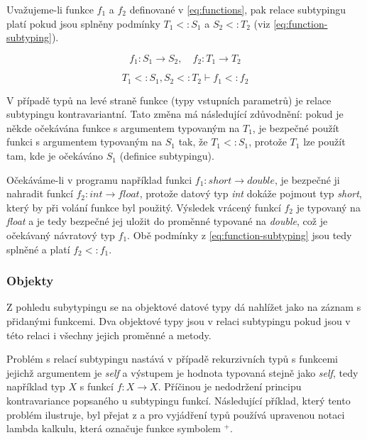\documentclass[czech,DP]{thesiskiv}
\begin{document}
Uvažujeme-li funkce $f_1$ a $f_2$ definované v \ref{eq:functions}, pak relace subtypingu platí pokud jsou splněny podmínky $T_1 <: S_1$ a $S_2 <: T_2$ (viz \ref{eq:function-subtyping}).

\begin{equation}
	f_1: S_1 \rightarrow S_2,\quad f_2: T_1 \rightarrow T_2
	\label{eq:functions}
\end{equation}

\begin{equation}
	T_1 <: S_1, S_2 <: T_2 \vdash f_1 <: f_2
	\label{eq:function-subtyping}
\end{equation}

V případě typů na levé straně funkce (typy vstupních parametrů) je relace subtypingu kontravariantní. Tato změna má následující zdůvodnění: pokud je někde očekávána funkce s argumentem typovaným na $T_1$, je bezpečné použít funkci s argumentem typovaným na $S_1$ tak, že $T_1 <: S_1$, protože $T_1$ lze použít tam, kde je očekáváno $S_1$ (definice subtypingu). 

Očekáváme-li v programu například funkci $f_1: short \rightarrow double$, je bezpečné ji nahradit funkcí $f_2: int \rightarrow float$, protože datový typ \textit{int} dokáže pojmout typ \textit{short}, který by při volání funkce byl použitý. Výsledek vrácený funkcí $f_2$ je typovaný na \textit{float} a je tedy bezpečné jej uložit do proměnné typované na \textit{double}, což je očekávaný návratový typ $f_1$. Obě podmínky z \ref{eq:function-subtyping} jsou tedy splněné a platí $f_2 <: f_1$.

\subsubsection{Objekty} 	

Z pohledu subytypingu se na objektové datové typy dá nahlížet jako na záznam s přidanými funkcemi. Dva objektové typy jsou v relaci subtypingu pokud jsou v této relaci i všechny jejich proměnné a metody\cite{abadi1995subytping}. 

Problém s relací subtypingu nastává v případě rekurzivních typů s funkcemi jejichž argumentem je \textit{self} a výstupem je hodnota typovaná stejně jako \textit{self}, tedy například typ $X$ s funkcí $f: X \rightarrow X$. Příčinou je nedodržení principu kontravariance popsaného u subtypingu funkcí. Následující příklad, který tento problém ilustruje, byl přejat z \cite{abadi1995subytping} a pro vyjádření typů používá upravenou notaci lambda kalkulu, která označuje funkce symbolem $^+$. 
\end{document}
